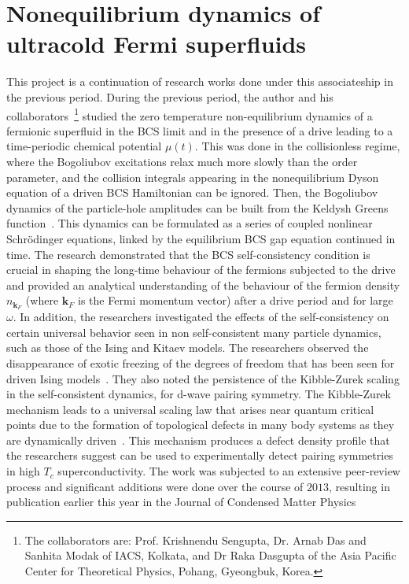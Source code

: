\documentclass[a4paper,10pt]{report}
\begin{document}
\section{\sc  Nonequilibrium dynamics of ultracold Fermi superfluids}
\label{sec:bcs}
This project is a continuation of research works done under this associateship in the previous period. During the previous period, the author and his collaborators~\footnote{The collaborators are: Prof. Krishnendu Sengupta,  Dr. Arnab Das and Sanhita Modak of IACS, Kolkata, and Dr Raka Dasgupta of the Asia Pacific Center for Theoretical Physics, Pohang, Gyeongbuk, Korea.} studied the zero temperature non-equilibrium dynamics of a fermionic superfluid in
the BCS limit and in the presence of a drive leading to a time-periodic chemical potential $\mu(t)$. This was done in the collisionless regime, where the Bogoliubov excitations relax much more slowly than the order parameter, and the collision integrals appearing in the nonequilibrium Dyson equation of a driven BCS Hamiltonian can be ignored. Then, the Bogoliubov dynamics of the particle-hole amplitudes can be built from the Keldysh Greens function~\cite{gorkov:volkov}. This dynamics can be formulated as a series of coupled nonlinear Schr\"odinger equations, linked by the equilibrium BCS gap equation continued in time. The research demonstrated that the BCS self-consistency condition is crucial in shaping the long-time behaviour of the fermions subjected to the drive and provided an analytical understanding of the behaviour of the fermion density $n_{{\mathbf k}_F}$ (where ${\mathbf k}_F$ is the Fermi momentum vector) after a drive period and for large $\omega$. In addition, the researchers investigated the effects of the self-consistency on certain universal behavior seen in non self-consistent many particle dynamics, such as those of the Ising and Kitaev models. The researchers observed the disappearance of exotic freezing of the degrees of freedom that has been seen for driven Ising models~\cite{arnab1}. They also noted the persistence of the Kibble-Zurek scaling in the self-consistent dynamics, for d-wave pairing symmetry. The Kibble-Zurek mechanism leads to a universal scaling law that arises near quantum critical points due to the formation of topological defects in many body systems as they are dynamically driven~\cite{zurek,bikashbabu}. This mechanism produces a defect density profile that the researchers suggest can be used to experimentally detect pairing symmetries in high $T_c$ superconductivity. The work was subjected to an extensive peer-review process and significant additions were done over the course of $2013$, resulting in publication earlier this year in the Journal of Condensed Matter Physics~\cite{mypaper2}
\end{document}
